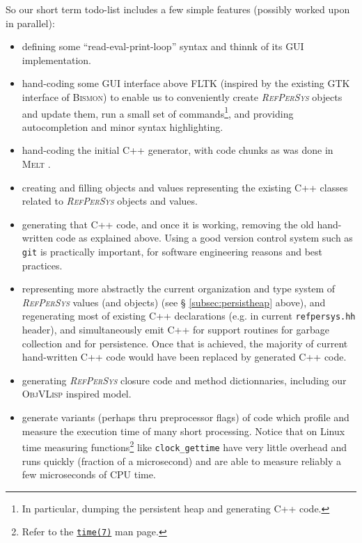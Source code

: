 \documentclass{IEEEtran}
\newcommand{\RefPerSys}{{\textit{\textsc{RefPerSys}}}}
\begin{document}
So our short term todo-list includes a few simple features (possibly
worked upon in parallel):

\begin{itemize}
  \item defining some ``read-eval-print-loop'' syntax and thinnk of
    its GUI implementation.
    
  \item hand-coding some GUI interface above FLTK (inspired by the
    existing GTK interface of \textsc{Bismon}) to enable us to
    conveniently create {\RefPerSys} objects and update them, run a
    small set of commands\footnote{In particular, dumping the
    persistent heap and generating C++ code.}, and providing
    autocompletion and minor syntax highlighting.

  \item hand-coding the initial C++ generator, with code chunks as was done in  \textsc{Melt} \cite{Starynkevitch-DSL2011}.

  \item creating and filling objects and values representing the existing C++ classes related to {\RefPerSys} objects and values.

    \item generating that C++ code, and once it is working, removing
      the old hand-written code as explained above. Using a good
      version control system such as \texttt{git} is practically
      important, for software engineering reasons and best practices.

      \item representing more abstractly the current organization and
        type system of {\RefPerSys} values (and objects) (see \S
        \ref{subsec:persistheap} above), and regenerating most of
        existing C++ declarations (e.g. in current
        \texttt{refpersys.hh} header), and simultaneously emit C++ for
        support routines for garbage collection and for
        persistence. Once that is achieved, the majority of current
        hand-written C++ code would have been replaced by generated
        C++ code.

      \item generating {\RefPerSys} closure code and method dictionnaries, including our \textsc{ObjVLisp} inspired model.

        \item generate variants (perhaps thru preprocessor flags) of
          code which profile and measure the execution time of many
          short processing. Notice that on Linux time measuring
          functions\footnote{Refer to the
          \href{https://man7.org/linux/man-pages/man7/time.7.html}{\texttt{time(7)}}
          man page.} like \texttt{clock\_gettime} have very little
          overhead and runs quickly (fraction of a microsecond) and
          are able to measure reliably a few microseconds of CPU time.
\end{itemize}
\end{document}
